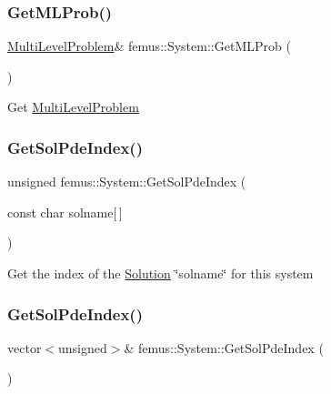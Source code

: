\subsubsection{\texorpdfstring{Get\+M\+L\+Prob()}{GetMLProb()}\hspace{0.1cm}{\footnotesize\ttfamily [2/2]}}
{\footnotesize\ttfamily \mbox{\hyperlink{classfemus_1_1_multi_level_problem}{Multi\+Level\+Problem}}\& femus\+::\+System\+::\+Get\+M\+L\+Prob (\begin{DoxyParamCaption}{ }\end{DoxyParamCaption})\hspace{0.3cm}{\ttfamily [inline]}}

Get \mbox{\hyperlink{classfemus_1_1_multi_level_problem}{Multi\+Level\+Problem}} \mbox{\label{classfemus_1_1_system_a4ebc859deb32b54c9936fa28f1485a93}} 
\subsubsection{\texorpdfstring{Get\+Sol\+Pde\+Index()}{GetSolPdeIndex()}\hspace{0.1cm}{\footnotesize\ttfamily [1/2]}}
{\footnotesize\ttfamily unsigned femus\+::\+System\+::\+Get\+Sol\+Pde\+Index (\begin{DoxyParamCaption}\item[{const char}]{solname\mbox{[}$\,$\mbox{]} }\end{DoxyParamCaption})}

Get the index of the \mbox{\hyperlink{classfemus_1_1_solution}{Solution}} \char`\"{}solname\char`\"{} for this system \mbox{\label{classfemus_1_1_system_a5006f00150911f0c1b6cb6d3fa9b2a6e}} 
\subsubsection{\texorpdfstring{Get\+Sol\+Pde\+Index()}{GetSolPdeIndex()}\hspace{0.1cm}{\footnotesize\ttfamily [2/2]}}
{\footnotesize\ttfamily vector$<$unsigned$>$\& femus\+::\+System\+::\+Get\+Sol\+Pde\+Index (\begin{DoxyParamCaption}{ }\end{DoxyParamCaption})\hspace{0.3cm}{\ttfamily [inline]}}


